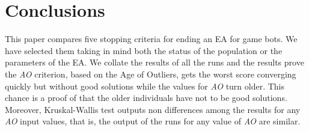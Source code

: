\documentclass[runningheads,a4paper]{llncs}
\begin{document}
\section{Conclusions}




This paper compares five stopping criteria for ending an EA for game bots. We have selected them taking in mind both the status of the population or the parameters of the EA. We collate the results of all the runs and the results prove the \textit{AO} criterion, based on the Age of Outliers, gets the worst score converging quickly but without good solutions while the values for \textit{AO} turn older. This chance is a proof of that the older individuals have not to be good solutions. Moreover, Kruskal-Wallis test outputs non differences among the results for any \textit{AO} input values, that is, the output of the runs for any value of \textit{AO} are similar.  


\end{document}
